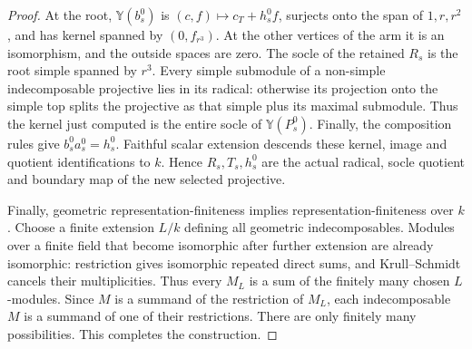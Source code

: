 \begin{proof}
At the root, $\mathbb Y(b_s^0)$ is $(c,f)\mapsto c_T+h_s^0f$, surjects onto the span of $1,r,r^2$, and has kernel spanned by $(0,f_{r^3})$. At the other vertices of the arm it is an isomorphism, and the outside spaces are zero. The socle of the retained $R_s$ is the root simple spanned by $r^3$. Every simple submodule of a non-simple indecomposable projective lies in its radical: otherwise its projection onto the simple top splits the projective as that simple plus its maximal submodule. Thus the kernel just computed is the entire socle of $\mathbb Y(P_s^0)$. Finally, the composition rules give $b_s^0a_s^0=h_s^0$. Faithful scalar extension descends these kernel, image and quotient identifications to $k$. Hence $R_s,T_s,h_s^0$ are the actual radical, socle quotient and boundary map of the new selected projective.

Finally, geometric representation-finiteness implies representation-finiteness over $k$. Choose a finite extension $L/k$ defining all geometric indecomposables. Modules over a finite field that become isomorphic after further extension are already isomorphic: restriction gives isomorphic repeated direct sums, and Krull--Schmidt cancels their multiplicities. Thus every $M_L$ is a sum of the finitely many chosen $L$-modules. Since $M$ is a summand of the restriction of $M_L$, each indecomposable $M$ is a summand of one of their restrictions. There are only finitely many possibilities. This completes the construction.
\end{proof}
